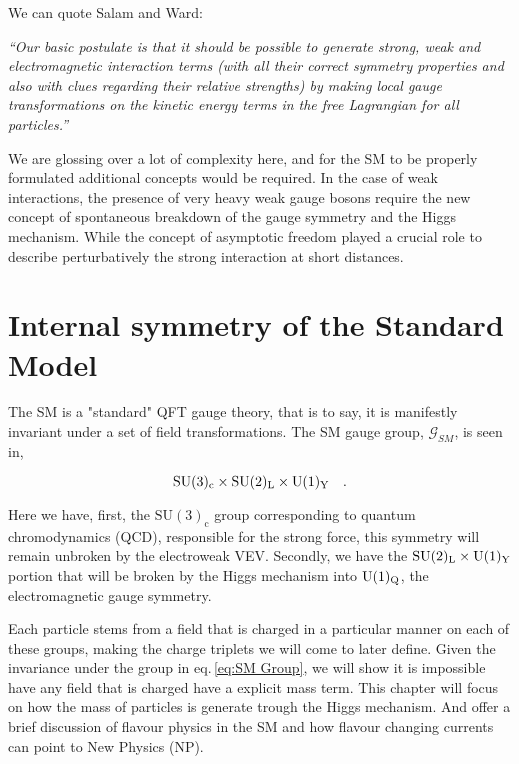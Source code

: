 We can quote Salam and Ward: %

\textit{“Our basic postulate is that it should be possible to generate strong,  weak and electromagnetic  interaction terms (with all their correct symmetry properties and also with clues regarding their relative strengths) by making local gauge transformations on the kinetic energy terms in the free Lagrangian for all particles.”}

We are glossing over a lot of complexity here, and for the SM to be properly formulated additional concepts would be required. In the case of weak interactions, the presence of very heavy weak gauge bosons require the new concept of spontaneous breakdown of the gauge symmetry and the Higgs mechanism. 
%
While the concept of asymptotic freedom played a crucial role to describe perturbatively the strong interaction at short distances.  
% 


\renewcommand{\cleardoublepage}{}
\renewcommand{\clearpage}{}

\section{Internal symmetry of the Standard Model}
%
The SM is a "standard" QFT gauge theory, that is to say, it is manifestly invariant under a set of field transformations. The SM gauge group, $\mathcal{G}_{SM}$, is seen in, 

\begin{equation}
\mathrm{SU}(3)_{\mathrm{c}} \times \mathrm{SU}(2)_{\mathrm{L}} \times \mathrm{U}(1)_{\mathrm{Y}} \quad  .
\label{eq:SM Group}
\end{equation} 

Here we have, first, the $\mathrm{SU}(3)_{\mathrm{c}}$ group corresponding to quantum chromodynamics (QCD), responsible for the strong force, this symmetry will remain unbroken by the electroweak VEV. Secondly, we have the $\mathrm{SU}(2)_{\mathrm{L}} \times \mathrm{U}(1)_{\mathrm{Y}}$ portion that will be broken by the Higgs mechanism into $\mathrm{U}(1)_{\mathrm{Q}}$, the electromagnetic gauge symmetry.

Each particle stems from a field that is charged in a particular manner on each of these groups, making the charge triplets we will come to later define. 
%
Given the invariance under the group in eq.\,\ref{eq:SM Group}, we will show it is impossible have any field that is charged have a explicit mass term. This chapter will focus on how the mass of particles is generate trough the Higgs mechanism. And offer a brief discussion of flavour physics in the SM and how flavour changing currents can point to New Physics (NP). 

